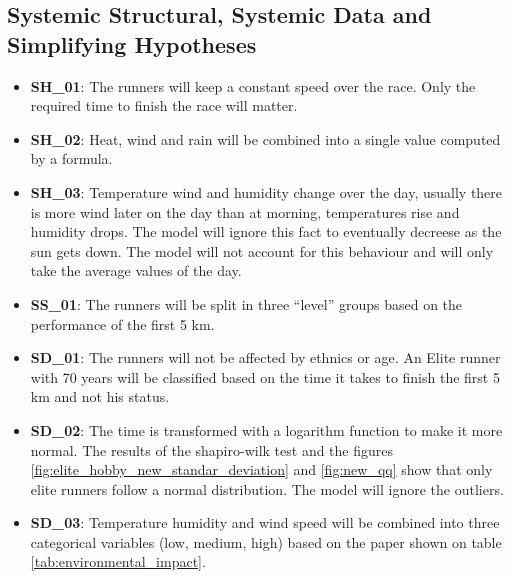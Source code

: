 \documentclass[conference]{IEEEtran}
\begin{document}

\subsection{Systemic Structural, Systemic Data and Simplifying Hypotheses}

\begin{itemize}
    \item \textbf{SH\_01}: The runners will keep a constant speed over the race. Only the required time to finish the race will matter.
    \item \textbf{SH\_02}: Heat, wind and rain will be combined into a single value computed by a formula.
    \item \textbf{SH\_03}: Temperature wind and humidity change over the day, usually there is more wind later on the day than at morning, temperatures rise and humidity drops. The model will ignore this fact to eventually decreese as the sun gets down. The model will not account for this behaviour and will only take the average values of the day.
    \item \textbf{SS\_01}: The runners will be split in three ``level'' groups based on the performance of the first 5 km.
    \item \textbf{SD\_01}: The runners will not be affected by ethnics or age. An Elite runner with 70 years will be classified based on the time it takes to finish the first 5 km and not his status.
    \item \textbf{SD\_02}: The time is transformed with a logarithm function to make it more normal. The results of the shapiro-wilk test and the  figures \ref{fig:elite_hobby_new_standar_deviation} and \ref{fig:new_qq} show that only elite runners follow a normal distribution. The model will ignore the outliers.
    \item \textbf{SD\_03}: Temperature humidity and wind speed will be combined into three categorical variables (low, medium, high) based on the paper \cite{b8} shown on table \ref{tab:environmental_impact}.
\end{itemize}
\end{document}
